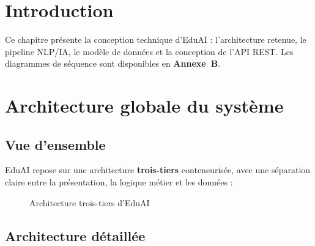 
\section{Introduction}

Ce chapitre présente la conception technique d'EduAI : l'architecture retenue, le pipeline NLP/IA, le modèle de données et la conception de l'API REST. Les diagrammes de séquence sont disponibles en \textbf{Annexe~B}.

\section{Architecture globale du système}

\subsection{Vue d'ensemble}

EduAI repose sur une architecture \textbf{trois-tiers} conteneurisée, avec une séparation claire entre la présentation, la logique métier et les données :

\begin{figure}[H]
\centering
{}
\caption{Architecture trois-tiers d'EduAI}
\label{fig:archi-global}
\end{figure}

\subsection{Architecture détaillée}

